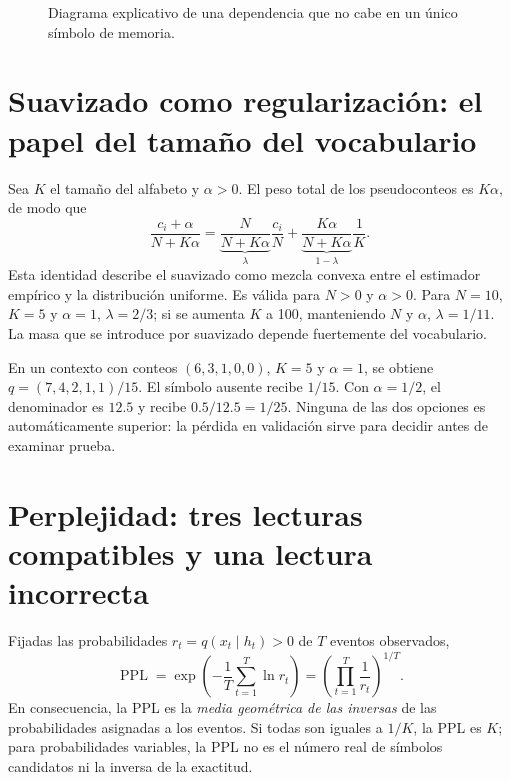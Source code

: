 \begin{figure}[H]\centering
{}
\caption{Diagrama explicativo de una dependencia que no cabe en un único símbolo de memoria.}
\end{figure}

\section*{Suavizado como regularización: el papel del tamaño del vocabulario}
Sea $K$ el tamaño del alfabeto y $\alpha>0$. El peso total de los
pseudoconteos es $K\alpha$, de modo que
\[
\frac{c_i+\alpha}{N+K\alpha}
=\underbrace{\frac{N}{N+K\alpha}}_{\lambda}\frac{c_i}{N}
 +\underbrace{\frac{K\alpha}{N+K\alpha}}_{1-\lambda}\frac1K.
\]
Esta identidad describe el suavizado como mezcla convexa entre el estimador
empírico y la distribución uniforme. Es válida para $N>0$ y $\alpha>0$.
Para $N=10$, $K=5$ y $\alpha=1$, $\lambda=2/3$; si se aumenta
$K$ a 100, manteniendo $N$ y $\alpha$, $\lambda=1/11$. La masa que
se introduce por suavizado depende fuertemente del vocabulario.

\begin{ejemplo}
En un contexto con conteos $(6,3,1,0,0)$, $K=5$ y $\alpha=1$,
se obtiene $q=(7,4,2,1,1)/15$. El símbolo ausente recibe $1/15$.
Con $\alpha=1/2$, el denominador es $12.5$ y recibe $0.5/12.5=1/25$.
Ninguna de las dos opciones es automáticamente superior: la pérdida en
validación sirve para decidir antes de examinar prueba.
\end{ejemplo}

\section*{Perplejidad: tres lecturas compatibles y una lectura incorrecta}
Fijadas las probabilidades $r_t=q(x_t\mid h_t)>0$ de $T$ eventos observados,
\[
\operatorname{PPL}
=\exp\left(-\frac1T\sum_{t=1}^T\ln r_t\right)
=\left(\prod_{t=1}^T\frac1{r_t}\right)^{1/T}.
\]
En consecuencia, la PPL es la \emph{media geométrica de las inversas}
de las probabilidades asignadas a los eventos. Si todas son iguales a
$1/K$, la PPL es $K$; para probabilidades variables, la PPL no es
el número real de símbolos candidatos ni la inversa de la exactitud.

